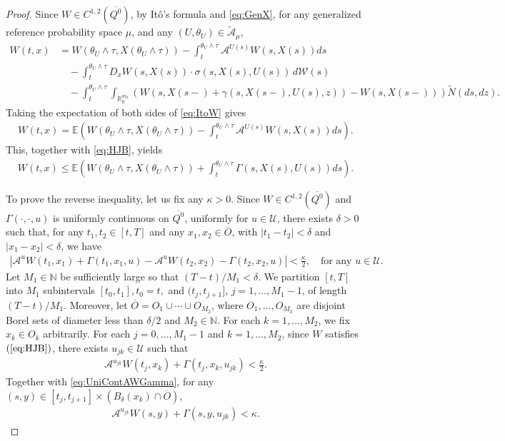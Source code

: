 \documentclass[amscd,amssymb,11pt]{article}
\numberwithin{theorem}{section}
\numberwithin{equation}{section}
\begin{document}
\begin{proof}
Since $W\in C^{1,2}(\overline{Q^{0}})$, by It\^{o}'s formula and \eqref{eq:GenX}, for any generalized reference probability space $\mu$, and any $(U,\theta_{U})\in\widetilde{\mathcal{A}}_{\mu}$,
\begin{align}\label{eq:ItoW}
W(t,x)&=W\!\left(\theta_{U}\wedge\tau,X(\theta_{U}\wedge\tau)\right)-\int_{t}^{\theta_{U}\wedge\tau}\mathscr{A}^{U(s)}W\!\left(s,X(s)\right)ds\nonumber\\
&\quad -\int_{t}^{\theta_{U}\wedge\tau}D_{x}W(s,X(s))\cdot\sigma(s,X(s),U(s))\,d\mathcal{W}(s)\nonumber\\
&\quad -\int_{t}^{\theta_{U}\wedge\tau}\int_{\mathbb{R}_{0}^{m_{2}}}\left(W\left(s,X(s-)+\gamma(s,X(s-),U(s),z)\right)-W\left(s,X(s-)\right)\right)\widetilde{N}(ds,dz).
\end{align}
Taking the expectation of both sides of \eqref{eq:ItoW} gives
\begin{align*}
W(t,x)=\mathbb{E}\left(W\left(\theta_{U}\wedge\tau,X(\theta_{U}\wedge\tau)\right)-\int_{t}^{\theta_{U}\wedge\tau}\mathscr{A}^{U(s)}W\left(s,X(s)\right)ds\right).
\end{align*}
This, together with \eqref{eq:HJB}, yields
\begin{align*}
W(t,x)\leq\mathbb{E}\left(W\left(\theta_{U}\wedge\tau,X(\theta_{U}\wedge\tau)\right)+\int_{t}^{\theta_{U}\wedge\tau}\Gamma\left(s,X(s),U(s)\right)ds\right).
\end{align*}

To prove the reverse inequality, let us fix any $\kappa>0$. Since $W\in C^{1,2}(\overline{Q^{0}})$ and $\Gamma(\cdot,\cdot,u)$ is uniformly continuous on $\overline{Q^{0}}$, uniformly for $u\in\mathcal{U}$, there exists $\delta>0$ such that, for any $t_{1},t_{2}\in[t,T]$ and any $x_{1},x_{2}\in\overline{O}$, with $|t_{1}-t_{2}|<\delta$ and $|x_{1}-x_{2}|<\delta$, we have
\begin{align}\label{eq:UniContAWGamma}
\left|\mathscr{A}^{u}W(t_{1},x_{1})+\Gamma(t_{1},x_{1},u)-\mathscr{A}^{u}W(t_{2},x_{2})-\Gamma(t_{2},x_{2},u)\right|<\frac{\kappa}{2},\quad\text{for any }u\in\mathcal{U}.
\end{align}
Let $M_{1}\in\mathbb{N}$ be sufficiently large so that $(T-t)/M_{1}<\delta$. We partition $[t,T]$ into $M_{1}$ subintervals
$[t_0,t_1], t_0=t,$ and $(t_{j},t_{j+1}]$, $j=1,\ldots,M_{1}-1$, of length $(T-t)/M_{1}$. Moreover, let $\overline{O}=O_{1}\cup\cdots\cup O_{M_{2}}$, where $O_{1},\ldots,O_{M_{2}}$ are disjoint Borel sets of diameter less than $\delta/2$ and $M_{2}\in\mathbb{N}$. For each $k=1,\ldots,M_{2}$, we fix $x_{k}\in O_{k}$ arbitrarily. For each $j=0,\ldots,M_{1}-1$ and $k=1,\ldots,M_{2}$, since $W$ satisfies $(\ref{eq:HJB})$, there exists $u_{jk}\in \mathcal{U}$ such that
\begin{align*}
\mathscr{A}^{u_{jk}}W(t_{j},x_{k})+\Gamma(t_{j},x_{k},u_{jk})<\frac{\kappa}{2}.
\end{align*}
Together with \eqref{eq:UniContAWGamma}, for any $(s,y)\in [t_{j},t_{j+1}]\times (B_{\delta}(x_k)\cap\overline{O})$,
\begin{align}\label{eq:UpperBoundAujkWGamma}
\mathscr{A}^{u_{jk}}W(s,y)+\Gamma(s,y,u_{jk})<\kappa.
\end{align}


\end{proof}
\end{document}
